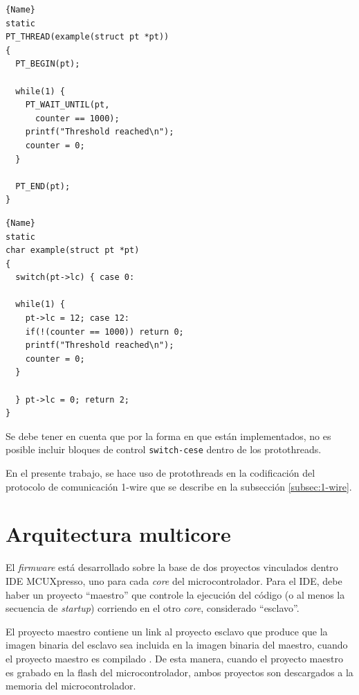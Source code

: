 \noindent\begin{minipage}{.5\textwidth}
\begin{lstlisting}[caption=Ejemplo de uso,frame=tlrb,basicstyle=\footnotesize,label={lst:proto1}]{Name}
static
PT_THREAD(example(struct pt *pt))
{
  PT_BEGIN(pt);
  
  while(1) {
    PT_WAIT_UNTIL(pt,
      counter == 1000);
    printf("Threshold reached\n");
    counter = 0;
  }
  
  PT_END(pt);
}
\end{lstlisting}
\end{minipage}\hfill
\begin{minipage}{.5\textwidth}
\begin{lstlisting}[caption=Código expandido,frame=tlrb,basicstyle=\footnotesize,label={lst:proto2}]{Name}
static
char example(struct pt *pt)
{
  switch(pt->lc) { case 0:
 
  while(1) {
    pt->lc = 12; case 12:
    if(!(counter == 1000)) return 0;
    printf("Threshold reached\n");
    counter = 0;
  }
 
  } pt->lc = 0; return 2;
}
\end{lstlisting}
\end{minipage}

Se debe tener en cuenta que por la forma en que están implementados, no es posible incluir bloques de control \texttt{switch-cese} dentro de los protothreads.	

En el presente trabajo, se hace uso de protothreads en la codificación del protocolo de comunicación 1-wire que se describe en la subsección \ref{subsec:1-wire}.


\section{Arquitectura multicore}
\label{sec:arquitectura}

El \textit{firmware} está desarrollado sobre la base de dos proyectos vinculados dentro IDE MCUXpresso, uno para cada \textit{core} del microcontrolador. Para el IDE, debe haber un proyecto ``maestro'' que controle la ejecución del código (o al menos la secuencia de \textit{startup}) corriendo en el otro \textit{core}, considerado ``esclavo''.  

El proyecto maestro contiene un link al proyecto esclavo que produce que la imagen binaria del esclavo sea incluida en la imagen  binaria del maestro, cuando el proyecto maestro es compilado \citep{nxp:mcuxpresso}. De esta manera, cuando el proyecto maestro es grabado en la flash del microcontrolador, ambos proyectos son descargados a la memoria del microcontrolador.


